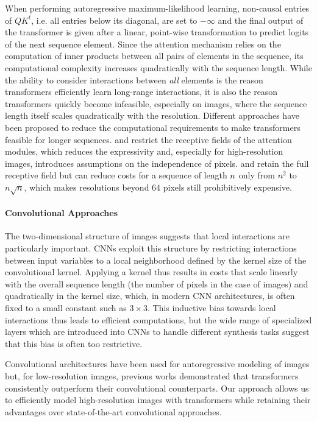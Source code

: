 \documentclass[final]{cvpr}
\begin{document}
When performing autoregressive maximum-likelihood learning, non-causal entries
of $QK^t$, i.e. all entries below its diagonal, are set to $-\infty$ and the
final output of the transformer is given after a linear, point-wise
transformation to predict logits of the next sequence element.
%
Since the attention mechanism relies on the computation of inner products
between all pairs of elements in the sequence, its computational complexity
increases quadratically with the sequence length.  While the ability to
consider interactions between \emph{all} elements is the reason transformers
efficiently learn long-range interactions, it is also the reason transformers
quickly become infeasible, especially on images, where the sequence length
itself scales quadratically with the resolution.
%
Different approaches have been proposed to reduce the computational
requirements to make transformers feasible for longer sequences.
\cite{parmar2018image} and \cite{weissenborn2020scaling} restrict the receptive
fields of the attention modules, which reduces the expressivity and, especially
for high-resolution images, introduces assumptions on the
independence of pixels.
\cite{child2019generating} and \cite{ho2019axial} retain the full receptive
field but can reduce costs for a sequence of length $n$ only from $n^2$ to $n \sqrt{n}$, which makes
resolutions beyond $64$ pixels still prohibitively expensive.
\modelfigure
\paragraph{Convolutional Approaches}
The two-dimensional structure of images suggests that local
interactions are particularly important. CNNs exploit this structure by
restricting interactions between input variables to a local neighborhood
defined by the kernel size of the convolutional kernel. Applying a kernel thus
results in costs that scale linearly with the overall sequence length (the
number of pixels in the case of images) and quadratically in the kernel size,
which, in modern CNN architectures, is often fixed to a small constant such as
$3\times3$. This inductive bias towards local interactions thus leads to
efficient computations, but the wide range of specialized layers which are
introduced into CNNs to handle different synthesis tasks
\cite{park2019semantic,zhang2020cross,Siarohin_2019_NeurIPS,zhu2019sean,zhou2017view}
suggest that this bias is often too restrictive.

%
%
Convolutional architectures have been used for 
autoregressive modeling of images \cite{oord2016pixel,oord2016conditional,chen2018pixelsnail} but, for
low-resolution images,
previous works \cite{parmar2018image,child2019generating,ho2019axial}
demonstrated that transformers consistently outperform their convolutional
counterparts.
Our approach allows us to efficiently model high-resolution images with
transformers while retaining their advantages over state-of-the-art
convolutional approaches.
\end{document}
